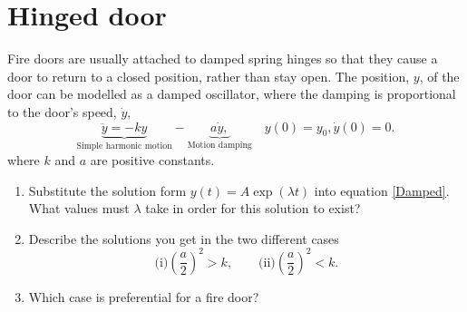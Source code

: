\documentclass[10pt]{article}
\newcommand{\bb}{\begin{equation}}
\newcommand{\ee}{\end{equation}}
\newcommand{\eqn}[1]{equation \eqref{#1}}
\renewcommand{\l}{\left(}
\renewcommand{\r}{\right)}
\begin{document}
\section{Hinged door}
Fire doors are usually attached to damped spring hinges so that they cause a door to return to a closed position, rather than stay open. The position, $y$, of the door can be modelled as a damped oscillator, where the damping is proportional to the door's speed, $\dot{y}$,
\bb
\underbrace{\ddot{y}=-ky}_{\textrm{Simple harmonic motion}}-\underbrace{a\dot{y},}_{\textrm{Motion damping}}\quad y(0)=y_0, \dot{y}(0)=0.\label{Damped}
\ee
where $k$ and $a$ are positive constants.
\begin{enumerate}
\item Substitute the solution form $y(t)=A\exp(\lambda t)$ into \eqn{Damped}. What values must $\lambda$ take in order for this solution to exist?
\item Describe the solutions you get in the two different cases
\bb
\textrm{(i)} \l\frac{a}{2}\r^2>k,\quad\quad \textrm{(ii)} \l\frac{a}{2}\r^2<k.
\ee
\item Which case is preferential for a fire door?
\end{enumerate}
\end{document}
